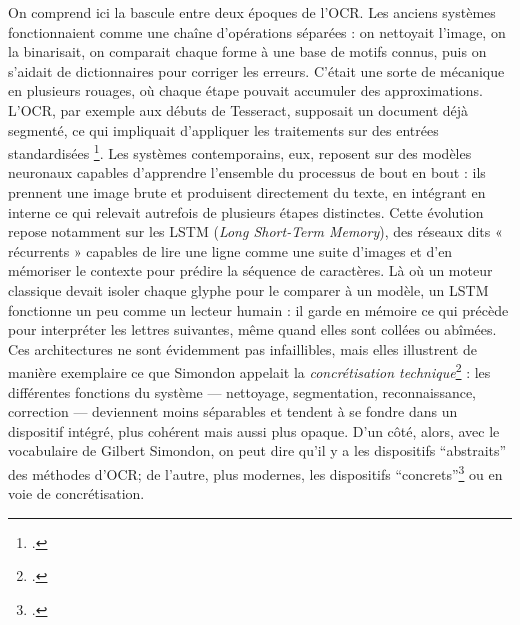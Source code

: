 On comprend ici la bascule entre deux époques de l’OCR. Les anciens systèmes fonctionnaient comme une chaîne d’opérations séparées : on nettoyait l’image, on la binarisait, on comparait chaque forme à une base de motifs connus, puis on s’aidait de dictionnaires pour corriger les erreurs. C’était une sorte de mécanique en plusieurs rouages, où chaque étape pouvait accumuler des approximations. L’OCR, par exemple aux débuts de Tesseract, supposait un document déjà segmenté, ce qui impliquait d’appliquer les traitements sur des entrées standardisées \footcite[][]{smith}. Les systèmes contemporains, eux, reposent sur des modèles neuronaux capables d’apprendre l’ensemble du processus de bout en bout : ils prennent une image brute et produisent directement du texte, en intégrant en interne ce qui relevait autrefois de plusieurs étapes distinctes. Cette évolution repose notamment sur les LSTM (\emph{Long Short-Term Memory}), des réseaux dits « récurrents » capables de lire une ligne comme une suite d’images et d’en mémoriser le contexte pour prédire la séquence de caractères. Là où un moteur classique devait isoler chaque glyphe pour le comparer à un modèle, un LSTM fonctionne un peu comme un lecteur humain : il garde en mémoire ce qui précède pour interpréter les lettres suivantes, même quand elles sont collées ou abîmées. Ces architectures ne sont évidemment pas infaillibles, mais elles illustrent de manière exemplaire ce que Simondon appelait la \emph{concrétisation technique}\footcite[][]{meot} : les différentes fonctions du système — nettoyage, segmentation, reconnaissance, correction — deviennent moins séparables et tendent à se fondre dans un dispositif intégré, plus cohérent mais aussi plus opaque. D'un côté, alors, avec le vocabulaire de Gilbert Simondon, on peut dire qu'il y a les dispositifs \enquote{abstraits} des méthodes d'OCR; de l'autre, plus modernes, les dispositifs \enquote{concrets}\footcite[][]{bontems} ou en voie de concrétisation.

